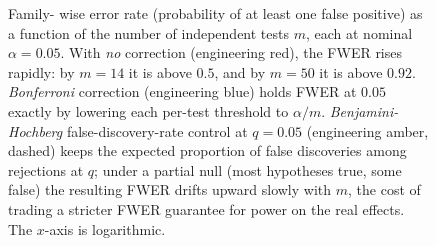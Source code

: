 \begin{figure}[ht]
\begin{tikzpicture}[x=1cm, y=1cm, font=\small]
\end{tikzpicture}
\caption[FWER vs number of tests under three corrections]{Family-
wise error rate (probability of at least one false positive) as a
function of the number of independent tests $m$, each at nominal
$\alpha = 0.05$. With \emph{no} correction (engineering red), the
FWER rises rapidly: by $m = 14$ it is above $0.5$, and by $m = 50$
it is above $0.92$. \emph{Bonferroni} correction (engineering blue)
holds FWER at $0.05$ exactly by lowering each per-test threshold to
$\alpha/m$. \emph{Benjamini-Hochberg} false-discovery-rate control
at $q = 0.05$ (engineering amber, dashed) keeps the expected
proportion of false discoveries among rejections at $q$; under a
partial null (most hypotheses true, some false) the resulting FWER
drifts upward slowly with $m$, the cost of trading a stricter FWER
guarantee for power on the real effects. The $x$-axis is
logarithmic.}
\label{fig:vol01:ch08:bonferroni-vs-fdr}
\end{figure}
